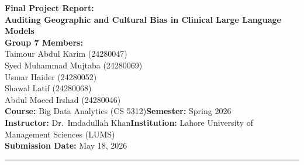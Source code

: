 \documentclass[11pt,a4paper]{article}
\begin{document}
\graphicspath{{figs/}}

\begin{center}
{\Large\textbf{Final Project Report:\\[0.2em]
Auditing Geographic and Cultural Bias in Clinical Large Language Models}}\\[1.0em]

\textbf{Group 7 Members:}\\[0.3em]
Taimour Abdul Karim (24280047)\\
Syed Muhammad Mujtaba (24280069)\\
Usmar Haider (24280052)\\
Shawal Latif (24280068)\\
Abdul Moeed Irshad (24280046)\\[0.8em]

\textbf{Course:} Big Data Analytics (CS 5312)\qquad\textbf{Semester:} Spring 2026\\
\textbf{Instructor:} Dr.\ Imdadullah Khan\qquad\textbf{Institution:} Lahore University of Management Sciences (LUMS)\\
\textbf{Submission Date:} May 18, 2026
\end{center}

\vspace{0.8em}\hrule\vspace{0.8em}
\end{document}
